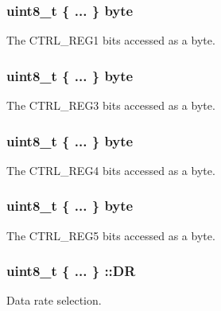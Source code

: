 \subsubsection[{byte}]{\setlength{\rightskip}{0pt plus 5cm}uint8\+\_\+t \{ ... \} byte}\label{group__accel__module_gad19b6f43f3cc6fafd274b703a69796e9}
The C\+T\+R\+L\+\_\+\+R\+E\+G1 bits accessed as a byte. \hypertarget{group__accel__module_ga21c0cbb71a2fe1c4cfd05ca0c2c47e92}{}
\subsubsection[{byte}]{\setlength{\rightskip}{0pt plus 5cm}uint8\+\_\+t \{ ... \} byte}\label{group__accel__module_ga21c0cbb71a2fe1c4cfd05ca0c2c47e92}
The C\+T\+R\+L\+\_\+\+R\+E\+G3 bits accessed as a byte. \hypertarget{group__accel__module_ga1e29d61d3add92b09bd96b1d179d3477}{}
\subsubsection[{byte}]{\setlength{\rightskip}{0pt plus 5cm}uint8\+\_\+t \{ ... \} byte}\label{group__accel__module_ga1e29d61d3add92b09bd96b1d179d3477}
The C\+T\+R\+L\+\_\+\+R\+E\+G4 bits accessed as a byte. \hypertarget{group__accel__module_ga10f573c97cad2cca809fbd4e62acaa89}{}
\subsubsection[{byte}]{\setlength{\rightskip}{0pt plus 5cm}uint8\+\_\+t \{ ... \} byte}\label{group__accel__module_ga10f573c97cad2cca809fbd4e62acaa89}
The C\+T\+R\+L\+\_\+\+R\+E\+G5 bits accessed as a byte. \hypertarget{group__accel__module_ga56b48c2aeb956562fa36246e2c9bc881}{}
\subsubsection[{D\+R}]{\setlength{\rightskip}{0pt plus 5cm}uint8\+\_\+t \{ ... \} \+::D\+R}\label{group__accel__module_ga56b48c2aeb956562fa36246e2c9bc881}
Data rate selection. \hypertarget{group__accel__module_gae205668059a828b8bf9bc8036b70d4a6}{}
